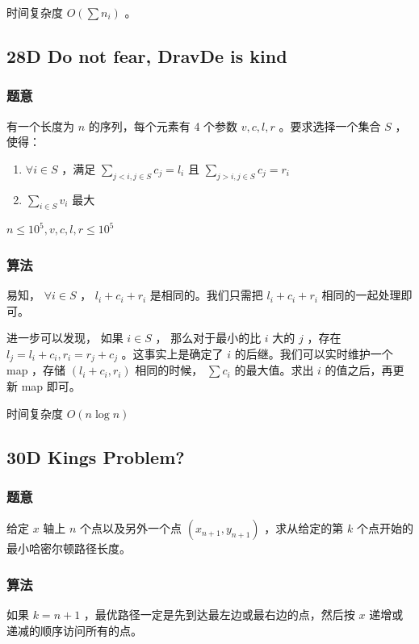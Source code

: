 \documentclass[11pt]{article}
\begin{document}
    时间复杂度 $O(\sum n_i)$ 。
\subsection{28D   Do not fear, DravDe is kind}
\label{sec-2-3}
\subsubsection{题意}
\label{sec-2-3-1}

    有一个长度为 $n$ 的序列，每个元素有 4 个参数 $v, c, l, r$ 。要求选择一个集合 $S$ ，使得：
\begin{enumerate}
\item $\forall i \in S$ ，满足 $\sum_{j < i, j \in S} c_j = l_i$ 且 $\sum_{j > i, j \in S} c_j = r_i$
\item $\sum_{i \in S} v_i$ 最大
\end{enumerate}
 
    $n \leq 10^5, v, c, l, r \leq 10^5$
\subsubsection{算法}
\label{sec-2-3-2}

    易知， $\forall i \in S$ ， $l_i + c_i + r_i$ 是相同的。我们只需把 $l_i + c_i + r_i$ 相同的一起处理即可。

    进一步可以发现， 如果 $i \in S$ ， 那么对于最小的比 $i$ 大的 $j$ ，存在 $l_j = l_i + c_i, r_i = r_j + c_j$ 。这事实上是确定了 $i$ 的后继。我们可以实时维护一个 map ，存储 $(l_i + c_i, r_i)$ 相同的时候， $\sum c_i$ 的最大值。求出 $i$ 的值之后，再更新 map 即可。

    时间复杂度 $O(n \log n)$
\subsection{30D   Kings Problem?}
\label{sec-2-4}
\subsubsection{题意}
\label{sec-2-4-1}

    给定 $x$ 轴上 $n$ 个点以及另外一个点 $(x_{n + 1}, y_{n + 1})$ ，求从给定的第 $k$ 个点开始的最小哈密尔顿路径长度。
\subsubsection{算法}
\label{sec-2-4-2}

    如果 $k = n + 1$ ，最优路径一定是先到达最左边或最右边的点，然后按 $x$ 递增或递减的顺序访问所有的点。
\end{document}
